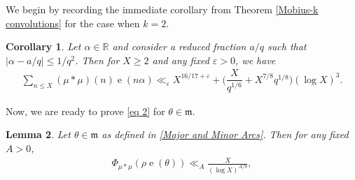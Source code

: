 \documentclass[11pt]{amsart}
\numberwithin{equation}{section}
\numberwithin{figure}{section}
\newtheorem{lemma}{Lemma}[section]
\newtheorem{corollary}[lemma]{Corollary}
\theoremstyle{definition}
\newcommand{\e}{\operatorname{e}}
\begin{document}
We begin by recording the immediate corollary from Theorem \ref{Mobius-k convolutions} for the case when $k=2$.
\begin{corollary} \label{theorem 4}
Let $\alpha\in \mathbb{R}$ and consider a reduced fraction $a/q$ such that $|\alpha-a/q|\leqslant1/q^2$. Then for $X \geqslant 2$ and any fixed $\varepsilon>0$, we have
\begin{align*}
\sum_{n\leqslant X }(\mu*\mu)(n)\e(n\alpha) \ll_{\varepsilon} X^{16/17+\varepsilon}+\bigg(\dfrac{X}{q^{1/6}} + X^{7/8}q^{1/8}\bigg)(\log X)^{3}. 
\end{align*}
\end{corollary}
Now, we are ready to prove \eqref{eq 2} for $\theta \in \mathfrak{m}$.
\begin{lemma} \label{lem:minor}
Let $\theta \in \mathfrak{m}$ as defined in \eqref{Major and Minor Arcs}. Then for any fixed $A>0$, 
\begin{align*}
        \Phi_{\mu * \mu}(\rho \e (\theta)) \ll_A \frac{X}{(\log X)^{A/9}},
\end{align*} 
\end{lemma} 
\end{document}
